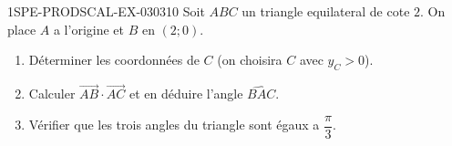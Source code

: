 \begin{exercice}{1SPE-PRODSCAL-EX-030}{3}{10}
Soit $ABC$ un triangle equilateral de cote $2$. On place $A$ a l'origine et $B$ en $(2; 0)$.
\begin{enumerate}
  \item Déterminer les coordonnées de $C$ (on choisira $C$ avec $y_C > 0$).
  \item Calculer $\overrightarrow{AB} \cdot \overrightarrow{AC}$ et en déduire l'angle $\widehat{BAC}$.
  \item Vérifier que les trois angles du triangle sont égaux a $\dfrac{\pi}{3}$.
\end{enumerate}
\end{exercice}
